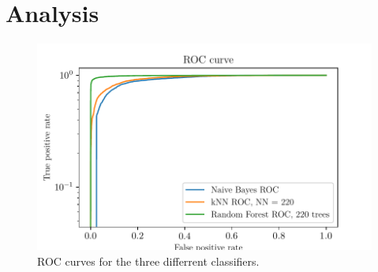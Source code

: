 \section{Analysis}\label{sec:Analysis}
\begin{figure}[tb]
  \centering
  \includegraphics[width=12cm,keepaspectratio]{plots/ROC.pdf}
  \caption{ROC curves for the three differrent classifiers.}
  \label{fig:ROC}
\end{figure}
